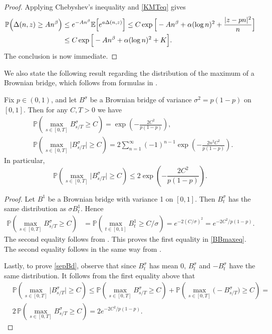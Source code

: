 \begin{proof}
	Applying Chebyshev's inequality and \eqref{KMTeq} gives
	\begin{align*}
	\mathbb{P}\Big(\Delta(n,z) \geq An^\beta\Big) &\leq e^{-An^\beta}\mathbb{E}\Big[e^{a\Delta(n,z)}\Big] \leq C\exp\Big[-An^\beta + \alpha(\log n)^2 + \frac{|z-pn|^2}{n}\Big]\\
	&\leq C\exp\Big[-An^\beta + \alpha(\log n)^2 + K\Big].
	\end{align*}
	The conclusion is now immediate.
\end{proof}

We also state the following result regarding the distribution of the maximum of a Brownian bridge, which follows from formulas in \cite[Chapter 12]{Dudley}.

\begin{lemma}\label{BBmax}
	Fix $p\in (0,1)$, and let $B^\sigma$ be a Brownian bridge of variance $\sigma^2 = p(1-p)$ on $[0,1]$. Then for any $C,T> 0$ we have
	\begin{equation}\label{BBmaxeq}
	\begin{split}
	&\mathbb{P}\left(\max_{s\in[0,T]} B^\sigma_{s/T} \geq C\right) = \exp\left( - \frac{2C^2}{p(1-p)}\right), \\ &\mathbb{P}\left(\max_{s\in[0,T]} \big| B^\sigma_{s/T} \big| \geq C\right) = 2\sum_{n=1}^\infty (-1)^{n-1} \exp\left(-\frac{2n^2C^2}{p(1-p)}\right).
	\end{split}
	\end{equation}
	In particular,
	\begin{equation}\label{sepBd}
	\mathbb{P}\left(\max_{s\in[0,T]} \big|B^\sigma_{s/T}\big| \geq C\right) \leq 2\exp\left( - \frac{2C^2}{p(1-p)}\right).
	\end{equation}
\end{lemma}

\begin{proof}
	Let $B^1$ be a Brownian bridge with variance 1 on $[0,1]$. Then $B^\sigma_t$ has the same distribution as $\sigma B^1_t$. Hence
	\begin{align*}
	\mathbb{P}\left( \max_{s\in[0,T]} B^\sigma_{s/T} \geq C \right) &= \mathbb{P}\left( \max_{t\in[0,1]} B^1_t \geq C/\sigma \right) = e^{-2(C/\sigma)^2} = e^{-2C^2/p(1-p)}.
	\end{align*}
	The second equality follows from \cite[Proposition 12.3.3]{Dudley}. This proves the first equality in \eqref{BBmaxeq}. The second equality follows in the same way from \cite[Proposition 12.3.4]{Dudley}.
	
	Lastly, to prove \eqref{sepBd}, observe that since $B^\sigma_t$ has mean 0, $B^\sigma_t$ and $-B^\sigma_t$ have the same distribution. It follows from the first equality above that
	\begin{align*}
	&\mathbb{P}\left( \max_{s\in[0,T]} \big| B^\sigma_{s/T}\big| \geq C \right) \leq \mathbb{P}\left( \max_{s\in[0,T]}  B^\sigma_{s/T} \geq C \right) + \mathbb{P}\left( \max_{s\in[0,T]}  \big(-B^\sigma_{s/T}\big) \geq C \right) = \\
	&2\,\mathbb{P}\left( \max_{s\in[0,T]}  B^\sigma_{s/T} \geq C \right) = 2e^{-2C^2/p(1-p)}.
	\end{align*}
\end{proof}

